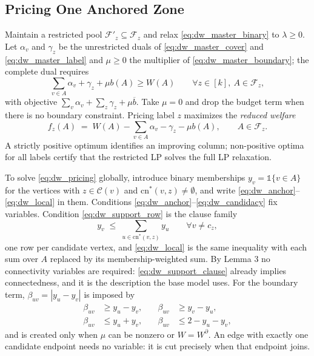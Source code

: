 \documentclass{article}
\begin{document}
\subsection{Pricing One Anchored Zone}
\label{app:dw_pricing}
Maintain a restricted pool $\mathcal F'_z \subseteq \mathcal F_z$ and relax
\eqref{eq:dw_master_binary} to $\lambda \geq 0$. Let $\alpha_v$ and $\gamma_z$
be the unrestricted duals of \eqref{eq:dw_master_cover} and
\eqref{eq:dw_master_label} and $\mu \geq 0$ the multiplier of
\eqref{eq:dw_master_boundary}; the complete dual requires
\begin{equation}\label{eq:dw_dual_row}
\sum_{v\in A}\alpha_v+\gamma_z+\mu b(A)\geq W(A)
\qquad \forall z\in[k],\ A\in\mathcal{F}_z,
\end{equation}
with objective $\sum_v \alpha_v + \sum_z \gamma_z + \mu \overline b$. Take
$\mu = 0$ and drop the budget term when there is no boundary constraint.
Pricing label $z$ maximizes the \emph{reduced welfare}
\begin{equation}\label{eq:dw_pricing}
f_z(A) \;=\; W(A)-\sum_{v\in A}\alpha_v-\gamma_z-\mu b(A),
\qquad A \in \mathcal F_z .
\end{equation}
A strictly positive optimum identifies an improving column; non-positive optima
for all labels certify that the restricted LP solves the full LP relaxation.

To solve \eqref{eq:dw_pricing} globally, introduce binary memberships
$y_v = \mathds{1}\{v \in A\}$ for the vertices with $z \in \mathcal C(v)$ and
$\text{cn}^{*}(v,z) \neq \emptyset$, and write
\eqref{eq:dw_anchor}--\eqref{eq:dw_local} in them. Conditions
\eqref{eq:dw_anchor}--\eqref{eq:dw_candidacy} fix variables. Condition
\eqref{eq:dw_support_row} is the clause family
\begin{equation}\label{eq:dw_support_clause}
y_v \;\leq\; \sum_{u \in \text{cn}^{*}(v,z)} y_u
\qquad \forall v \neq c_z ,
\end{equation}
one row per candidate vertex, and \eqref{eq:dw_local} is the same inequality
with each sum over $A$ replaced by its membership-weighted sum. By Lemma 3 no
connectivity variables are required: \eqref{eq:dw_support_clause} already
implies connectedness, and it is the description the base model uses. For the
boundary term, $\beta_{uv} = |y_u - y_v|$ is imposed by
\begin{equation}\label{eq:dw_edge_linearization}
\begin{aligned}
\beta_{uv}&\geq y_u-y_v, &\quad \beta_{uv}&\geq y_v-y_u,\\
\beta_{uv}&\leq y_u+y_v, &\quad \beta_{uv}&\leq 2-y_u-y_v,
\end{aligned}
\end{equation}
and is created only when $\mu$ can be nonzero or $W = W^{\partial}$. An edge
with exactly one candidate endpoint needs no variable: it is cut precisely when
that endpoint joins.
\end{document}

